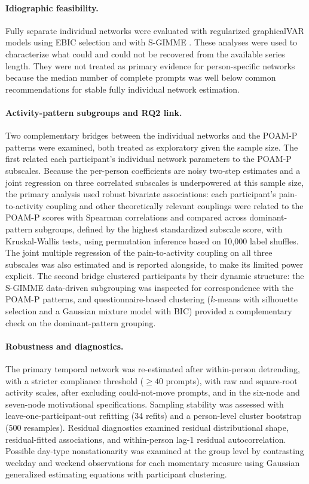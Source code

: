 \documentclass[11pt,a4paper]{article}
\begin{document}
\paragraph{Idiographic feasibility.} Fully separate individual networks were evaluated with
regularized graphicalVAR models using EBIC selection \citep{epskamp2018tutorial} and with
S-GIMME \citep{lane2019uncovering}. These analyses were used to characterize what could and
could not be recovered from the available series length. They were not treated as primary
evidence for person-specific networks because the median number of complete prompts was well
below common recommendations for stable fully individual network estimation.

\paragraph{Activity-pattern subgroups and RQ2 link.} Two complementary bridges between the
individual networks and the POAM-P patterns were examined, both treated as exploratory given
the sample size. The first related each participant's individual network parameters to the
POAM-P subscales. Because the per-person coefficients are noisy two-step estimates and a joint
regression on three correlated subscales is underpowered at this sample size, the primary
analysis used robust bivariate associations: each participant's pain-to-activity coupling and
other theoretically relevant couplings were related to the POAM-P scores with Spearman
correlations and compared across dominant-pattern subgroups, defined by the highest
standardized subscale score, with Kruskal-Wallis tests, using permutation inference based on
10,000 label shuffles. The joint multiple regression of the pain-to-activity coupling on all
three subscales was also estimated and is reported alongside, to make its limited power
explicit. The second bridge clustered participants by their dynamic structure: the S-GIMME
data-driven subgrouping was inspected for correspondence with the POAM-P patterns, and
questionnaire-based clustering ($k$-means with silhouette selection and a Gaussian mixture
model with BIC) provided a complementary check on the dominant-pattern grouping.

\paragraph{Robustness and diagnostics.} The primary temporal network was re-estimated after
within-person detrending, with a stricter compliance threshold ($\geq 40$ prompts), with raw
and square-root activity scales, after excluding could-not-move prompts, and in the six-node
and seven-node motivational specifications. Sampling stability was assessed with
leave-one-participant-out refitting
(34 refits) and a person-level cluster bootstrap (500 resamples). Residual diagnostics
examined residual distributional shape, residual-fitted associations, and within-person
lag-1 residual autocorrelation. Possible day-type nonstationarity was examined at the group
level by contrasting weekday and weekend observations for each momentary measure using
Gaussian generalized estimating equations with participant clustering.
\end{document}
